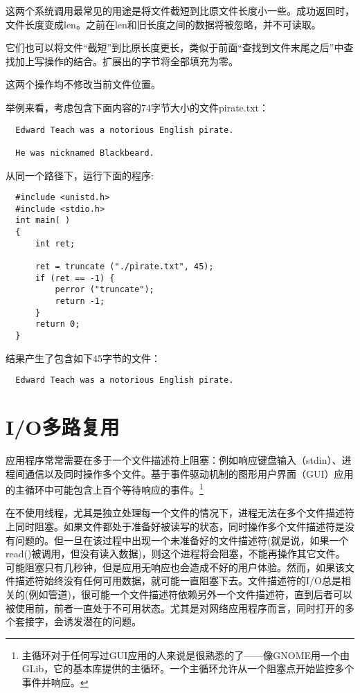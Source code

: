 这两个系统调用最常见的用途是将文件截短到比原文件长度小一些。成功返回时，文件长度变成len。之前在len和旧长度之间的数据将被忽略，并不可读取。

它们也可以将文件“截短”到比原长度更长，类似于前面“查找到文件末尾之后”中查找加上写操作的结合。扩展出的字节将全部填充为零。

这两个操作均不修改当前文件位置。

举例来看，考虑包含下面内容的74字节大小的文件pirate.txt：

\begin{verbatim}
  Edward Teach was a notorious English pirate.

  He was nicknamed Blackbeard.
\end{verbatim}

从同一个路径下，运行下面的程序: 

\begin{lstlisting}
  #include <unistd.h>
  #include <stdio.h>
  int main( )
  {
      int ret;

      ret = truncate ("./pirate.txt", 45);
      if (ret == -1) {
          perror ("truncate");
          return -1;
      }
      return 0;
  }
\end{lstlisting}

结果产生了包含如下45字节的文件：

\begin{verbatim}
  Edward Teach was a notorious English pirate. 
\end{verbatim}

\section{I/O多路复用}

应用程序常常需要在多于一个文件描述符上阻塞：例如响应键盘输入（stdin）、进程间通信以及同时操作多个文件。基于事件驱动机制的图形用户界面（GUI）应用的主循环中可能包含上百个等待响应的事件。\footnote[1]{主循环对于任何写过GUI应用的人来说是很熟悉的了——像GNOME用一个由GLib，它的基本库提供的主循环。一个主循环允许从一个阻塞点开始监控多个事件并响应。}

在不使用线程，尤其是独立处理每一个文件的情况下，进程无法在多个文件描述符上同时阻塞。如果文件都处于准备好被读写的状态，同时操作多个文件描述符是没有问题的。但一旦在该过程中出现一个未准备好的文件描述符(就是说，如果一个read()被调用，但没有读入数据)，则这个进程将会阻塞，不能再操作其它文件。可能阻塞只有几秒钟，但是应用无响应也会造成不好的用户体验。然而，如果该文件描述符始终没有任何可用数据，就可能一直阻塞下去。文件描述符的I/O总是相关的(例如管道)，很可能一个文件描述符依赖另外一个文件描述符，直到后者可以被使用前，前者一直处于不可用状态。尤其是对网络应用程序而言，同时打开的多个套接字，会诱发潜在的问题。


